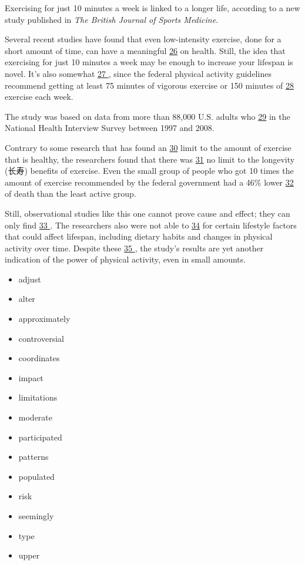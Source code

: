 \documentclass[UTF8,11pt]{ctexart}
\begin{document}
Exercising for just 10 minutes a week is linked to a longer life, according to a new study published in \textit{The British Journal of Sports Medicine}.


Several recent studies have found that even low-intensity exercise, done for a short amount of time, can have a meaningful \uline{26} on health. Still, the idea that exercising for just 10 minutes a week may be enough to increase your lifespan is novel. It’s also somewhat \uline{27 }, since the federal physical activity guidelines recommend getting at least 75 minutes of vigorous exercise or 150 minutes of \uline{28} exercise each week.


The study was based on data from more than 88,000 U.S. adults who \uline{29} in the National Health Interview Survey between 1997 and 2008.


Contrary to some research that has found an \uline{30} limit to the amount of exercise that is healthy, the researchers found that there was \uline{31} no limit to the longevity (长寿) benefits of exercise. Even the small group of people who got 10 times the amount of exercise recommended by the federal government had a 46\% lower \uline{32} of death than the least active group.


Still, observational studies like this one cannot prove cause and effect; they can only find \uline{33 }. The researchers also were not able to \uline{34} for certain lifestyle factors that could affect lifespan, including dietary habits and changes in physical activity over time. Despite these \uline{35 }, the study’s results are yet another indication of the power of physical activity, even in small amounts.


\begin{itemize}[leftmargin=2em,itemsep=.2em,topsep=.4em]\item[A.] adjust
\item[B.] alter
\item[C.] approximately
\item[D.] controversial
\item[E.] coordinates
\item[F.] impact
\item[G.] limitations
\item[H.] moderate
\item[I.] participated
\item[J.] patterns
\item[K.] populated
\item[L.] risk
\item[M.] seemingly
\item[N.] type
\item[O.] upper
\end{itemize}
\end{document}
